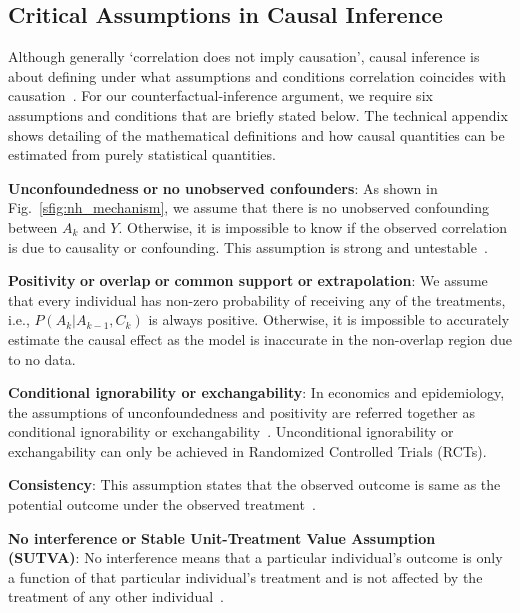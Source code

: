 \documentclass[letterpaper]{article} %
\begin{document}
\subsection{Critical Assumptions in Causal Inference}
Although generally `correlation does not imply causation', causal inference is about defining under what assumptions and conditions correlation coincides with causation~\cite{pearl2009causality, neal2020Intro2CI}. For our counterfactual-inference argument, we require six assumptions and conditions that are briefly stated below.
The technical appendix shows detailing of the mathematical definitions and how causal quantities can be estimated from purely statistical quantities.

\begin{inparaenum}[1.]
\item \textbf{Unconfoundedness} \textbf{or} \textbf{no unobserved confounders}:
As shown in Fig.~\ref{sfig:nh_mechanism}, we assume that there is no unobserved confounding between $A_k$ and $Y$. Otherwise, it is impossible to know if the observed correlation is due to causality or confounding. This assumption is strong and untestable~\cite{Rubin1990unconfoundedness}.

\item \textbf{Positivity} \textbf{or} \textbf{overlap} \textbf{or} \textbf{common support} \textbf{or} \textbf{extrapolation}: We assume that every individual has non-zero probability of receiving any of the treatments, i.e., $P(A_k|A_{k-1},C_k)$ is always positive. Otherwise, it is impossible to accurately estimate the causal effect as the model is inaccurate in the non-overlap region due to no data.%

\item \textbf{Conditional ignorability or exchangability}: In economics and epidemiology, the assumptions of unconfoundedness and positivity are referred together as conditional ignorability or exchangability~\cite{Rosenbaum1983propensityscoreipw}. Unconditional ignorability or exchangability can only be achieved in Randomized Controlled Trials (RCTs).

\item \textbf{Consistency}: This assumption states that the observed outcome is same as the potential outcome under the observed treatment~\cite{ROBINS1986gcom, cole2009consistency, vanderweele2009concerningconsistency}.

\item \textbf{No interference} \textbf{or} \textbf{Stable Unit-Treatment Value Assumption (SUTVA)}: No interference means that a particular individual's outcome is only a function of that particular individual's treatment and is not affected by the treatment of any other individual~\cite{cox1958planning}.


\end{inparaenum}
\end{document}
